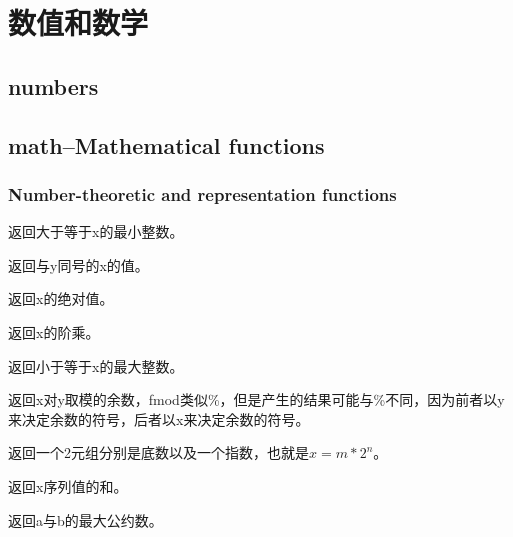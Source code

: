 \chapter{数值和数学}
\section{numbers}
\section{math--Mathematical functions}
\subsection{Number-theoretic and representation functions}
\noindent{\color{red}{math.ceil(x):}}
\par{返回大于等于x的最小整数。}\\

\noindent{\color{red}{math.copysign(x, y):}}
\par{返回与y同号的x的值。}\\

\noindent{\color{red}{math.fabs(x):}}
\par{返回x的绝对值。}\\

\noindent{\color{red}{math.factorial(x):}}
\par{返回x的阶乘。}\\

\noindent{\color{red}{math.floor(x):}}
\par{返回小于等于x的最大整数。}\\

\noindent{\color{red}{math.fmod(x, y):}}
\par{返回x对y取模的余数，fmod类似\%，但是产生的结果可能与\%不同，因为前者以y来决定余数的符号，后者以x来决定余数的符号。}\\

\noindent{\color{red}{math.frexp(x):}}
\par{返回一个2元组分别是底数以及一个指数，也就是$x=m*2^n$。}\\

\noindent{\color{red}{math.fsun(iterable):}}
\par{返回x序列值的和。}\\

\noindent{\color{red}{math.gcd(a, b):}}
\par{返回a与b的最大公约数。}\\

